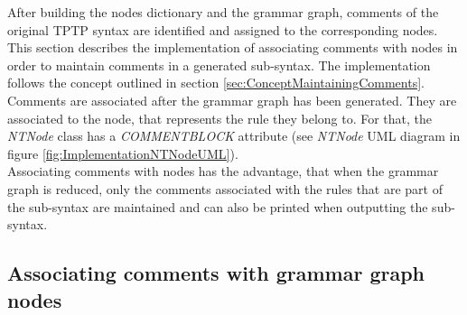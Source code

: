 After building the nodes dictionary and the grammar graph, comments of the original \ac{TPTP} syntax are identified and assigned to the corresponding nodes.
This section describes the implementation of associating comments with nodes in order to maintain comments in a generated sub-syntax.
The implementation follows the concept outlined in section \ref{sec:ConceptMaintainingComments}.
Comments are associated after the grammar graph has been generated.
They are associated to the node, that represents the rule they belong to.
For that, the \textit{NTNode} class has a \textit{COMMENT\textunderscore BLOCK} attribute (see \textit{NTNode} UML diagram in figure \ref{fig:ImplementationNTNodeUML}).\\
Associating comments with nodes has the advantage, that when the grammar graph is reduced, only the comments associated with the rules that are part of the sub-syntax are maintained and can also be printed when outputting the sub-syntax.\\

\subsection{Associating comments with grammar graph nodes}\label{sec:ImplementationMaintainingCommentsAssociateWithNodes}

